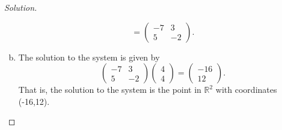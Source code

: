\documentclass[12pt]{amsart}
\begin{document}
\begin{thm}[20 Points]
\begin{proof}[Solution]
\begin{enumerate}[(a)]
$$      = \left(\begin{array}{ccc}
            -7 & 3\\
            5 & -2
        \end{array}
      \right).$$
    \item
      The solution to the system is given by 
      $$\left(\begin{array}{ccc}
            -7 & 3\\
            5 & -2
        \end{array}
      \right)
      \left(\begin{array}{c}
        4\\
        4
      \end{array}
      \right) 
      = 
      \left(\begin{array}{c}
        -16\\
        12
      \end{array}
      \right).$$
      That is, the solution to the system is the point in $\mathbb{R}^2$ with coordinates (-16,12).
    \end{enumerate}
    

\end{proof}
\end{thm}
\end{document}
